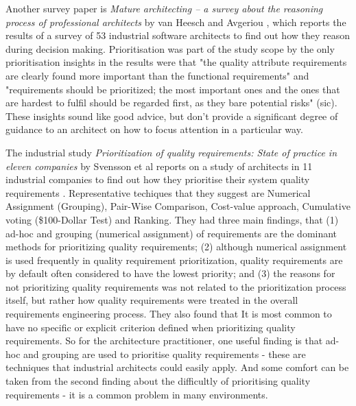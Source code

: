 Another survey paper is \emph{Mature architecting -- a survey about the reasoning process of professional architects} by van Heesch and Avgeriou \cite{vanheesch2011-maturearch}, which reports the results of a survey of 53 industrial software architects to find out how they reason during decision making.  Prioritisation was part of the study scope by the only prioritisation insights in the results were   
that "the quality attribute requirements are clearly found more important than the functional requirements" and "requirements should be prioritized; the most important ones and the ones that are hardest to fulfil should be regarded first, as they bare potential risks" (sic).  These insights sound like good advice, but don't provide a significant degree of guidance to an architect on how to focus attention in a particular way.

The industrial study \emph{Prioritization of quality requirements: State of practice in eleven companies} by Svensson et al reports on a study of architects in 11 industrial companies to find out how they prioritise their system quality requirements \cite{svensson2011-qrprioritisation} .  Representative techiques that they suggest are Numerical Assignment (Grouping), Pair-Wise Comparison, Cost-value approach, Cumulative voting (\$100-Dollar Test) and Ranking.  They had three main findings, that (1) ad-hoc and grouping (numerical assignment) of requirements are the dominant methods for prioritizing quality requirements; (2) although numerical assignment is used frequently in quality requirement prioritization, quality requirements are by default often considered to have the lowest priority; and (3) the reasons for not prioritizing quality requirements was not related to the prioritization process itself, but rather how quality requirements were treated in the overall requirements engineering process.  They also found that It is most common to have no specific or explicit criterion defined when prioritizing quality requirements.  So for the architecture practitioner, one useful finding is that ad-hoc and grouping are used to prioritise quality requirements - these are techniques that industrial architects could easily apply.  And some comfort can be taken from the second finding about the difficultly of prioritising quality requirements - it is a common problem in many environments.

